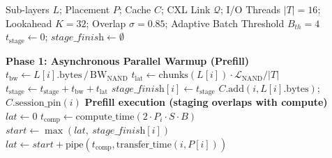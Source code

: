 \documentclass[10pt,conference,letterpaper]{IEEEtran}
\begin{document}
\begin{algorithm}[t]
\caption{SemSched: Unified Staging and Execution}
\label{alg:SemSched_final}
\begin{algorithmic}[1]
\footnotesize
\Require Sub-layers $L$; Placement $P$; Cache $C$; CXL Link $\mathcal{Q}$; I/O Threads $|T|=16$; Lookahead $K=32$; Overlap $\sigma=0.85$; Adaptive Batch Threshold $B_{th}=4$
\State $t_{\text{stage}} \leftarrow 0$; $\textit{stage\_finish} \leftarrow \emptyset$

\Statex \textbf{Phase 1: Asynchronous Parallel Warmup (Prefill)}
    \State $t_{\text{bw}} \leftarrow L[i].\text{bytes} \,/\, \text{BW}_{\text{NAND}}$
    \State $t_{\text{lat}} \leftarrow \text{chunks}(L[i]) \cdot \mathcal{L}_{\text{NAND}} / |T|$
    \State $t_{\text{stage}} \leftarrow t_{\text{stage}} + t_{\text{bw}} + t_{\text{lat}}$
    \State $\textit{stage\_finish}[i] \leftarrow t_{\text{stage}}$
    \State $C.\mathrm{add}(i, L[i].\text{bytes})$; $C.\mathrm{session\_pin}(i)$
\EndFor
\Statex \textbf{Prefill execution (staging overlaps with compute)}
\State $\textit{lat} \leftarrow 0$
    \State $t_{\text{comp}} \leftarrow \text{compute\_time}(2 \cdot P_i \cdot S \cdot B)$
    \State $\textit{start} \leftarrow \max(\textit{lat},\ \textit{stage\_finish}[i])$
    \State $\textit{lat} \leftarrow \textit{start} + \text{pipe}(t_{\text{comp}}, \text{transfer\_time}(i, P[i]))$
\EndFor


\end{algorithmic}
\end{algorithm}
\end{document}
